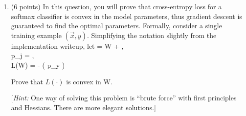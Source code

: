 \begin{enumerate}[resume]
\pagebreak
\item
(6 points) In this question, you will prove that cross-entropy loss for a softmax classifier is convex in the model parameters, thus gradient
descent is guaranteed to find the optimal parameters. Formally, consider a single training example $(\vec{x}, y)$.
Simplifying the notation slightly from the implementation writeup, let
\beqn
{} = W + , \\
p_j = , \\
L(W) = - \log \left( p_{y} \right)
\eeqn

Prove that $L(\cdot)$ is convex in W.

%

[\emph{Hint:} One way of solving this problem is ``brute force'' with first principles and Hessians. There are more elegant solutions.]
\end{enumerate}

